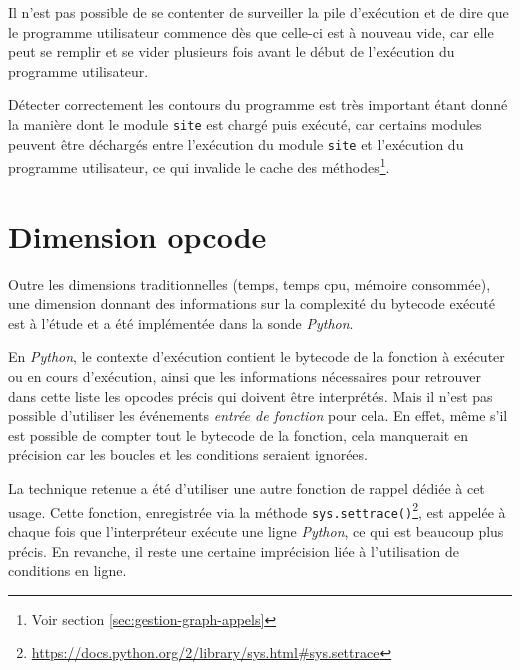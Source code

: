 \begin{note}
Il n'est pas possible de se contenter de surveiller la pile d'exécution et de dire que le programme utilisateur commence dès que celle-ci est à nouveau vide, car elle peut se remplir et se vider plusieurs fois avant le début de l'exécution du programme utilisateur.
\end{note}

\begin{note}
Détecter correctement les contours du programme est très important étant donné la manière dont le module \verb|site| est chargé puis exécuté, car certains modules peuvent être déchargés entre l'exécution du module \verb|site| et l'exécution du programme utilisateur, ce qui invalide le cache des méthodes\footnote{Voir section \vref{sec:gestion-graph-appels}}.
\end{note}
\clearpage
  \section{Dimension opcode}
    
Outre les dimensions traditionnelles (temps, temps cpu, mémoire consommée), une dimension donnant des informations sur la complexité du \gls{bytecode} exécuté est à l'étude et a été implémentée dans la sonde \emph{Python}.

En \emph{Python}, le contexte d'exécution contient le \gls{bytecode} de la fonction à exécuter ou en cours d'exécution, ainsi que les informations nécessaires pour retrouver dans cette liste les \glspl{opcode} précis qui doivent être interprétés. Mais il n'est pas possible d'utiliser les événements \emph{entrée de fonction} pour cela. En effet, même s'il est possible de compter tout le \gls{bytecode} de la fonction, cela manquerait en précision car les boucles et les conditions seraient ignorées.

La technique retenue a été d'utiliser une autre fonction de rappel dédiée à cet usage. Cette fonction, enregistrée via la méthode \verb|sys.settrace()|\footnote{\url{https://docs.python.org/2/library/sys.html#sys.settrace}}, est appelée à chaque fois que l'interpréteur exécute une ligne \emph{Python}, ce qui est beaucoup plus précis. En revanche, il reste une certaine imprécision liée à l'utilisation de conditions en ligne.


